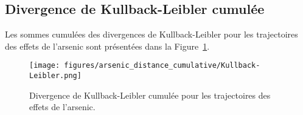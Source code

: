 \subsection{Divergence de Kullback-Leibler cumulée}
Les sommes cumulées des divergences de Kullback-Leibler pour les trajectoires des effets de l'arsenic sont présentées dans la Figure~\ref{fig:arsenic_distance_cumulative-Kullback-Leibler}.
\begin{figure}[H]
	\centering
	\texttt{[image: figures/arsenic\_distance\_cumulative/Kullback-Leibler.png]}
	\caption{Divergence de Kullback-Leibler cumulée pour les trajectoires des effets de l'arsenic.}
	\label{fig:arsenic_distance_cumulative-Kullback-Leibler}
\end{figure}